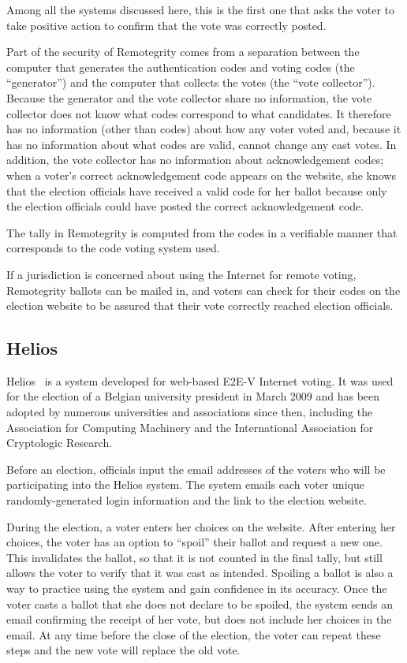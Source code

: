 Among all the systems discussed here, this is the first one that asks
the voter to take positive action to confirm that the vote was
correctly posted.

Part of the security of Remotegrity comes from a separation between
the computer that generates the authentication codes and voting codes
(the ``generator'') and the computer that collects the votes (the
``vote collector''). Because the generator and the vote collector
share no information, the vote collector does not know what codes
correspond to what candidates. It therefore has no information (other
than codes) about how any voter voted and, because it has no
information about what codes are valid, cannot change any cast
votes. In addition, the vote collector has no information about
acknowledgement codes; when a voter's correct acknowledgement code
appears on the website, she knows that the election officials have
received a valid code for her ballot because only the election
officials could have posted the correct acknowledgement code.

The tally in Remotegrity is computed from the codes in a verifiable
manner that corresponds to the code voting system used.

If a jurisdiction is concerned about using the Internet for remote
voting, Remotegrity ballots can be mailed in, and voters can check for
their codes on the election website to be assured that their vote
correctly reached election officials.

\subsection{Helios}

Helios~\cite{adida2008,adida2009} is a system developed for web-based
E2E-V Internet voting. It was used for the election of a Belgian
university president in March 2009 and has been adopted by numerous
universities and associations since then, including the Association
for Computing Machinery and the International Association for
Cryptologic Research.

Before an election, officials input the email addresses of the voters
who will be participating into the Helios system. The system emails
each voter unique randomly-generated login information and the link to
the election website.

During the election, a voter enters her choices on the website. After
entering her choices, the voter has an option to ``spoil'' their
ballot and request a new one. This invalidates the ballot, so that it
is not counted in the final tally, but still allows the voter to
verify that it was cast as intended. Spoiling a ballot is also a way
to practice using the system and gain confidence in its accuracy. Once
the voter casts a ballot that she does not declare to be spoiled, the
system sends an email confirming the receipt of her vote, but does not
include her choices in the email. At any time before the close of the
election, the voter can repeat these steps and the new vote will
replace the old vote.


